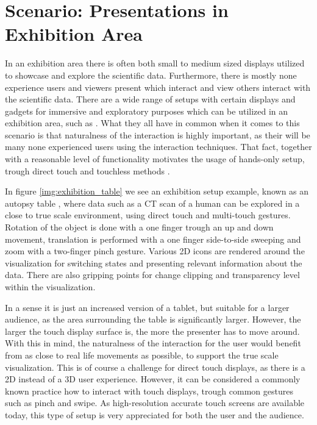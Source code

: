 \documentclass[review,journal]{vgtc}         %
\begin{document}
\section{Scenario: Presentations in Exhibition Area}

In an exhibition area there is often both small to medium sized displays utilized to showcase and explore the scientific data. Furthermore, there is mostly none experience users and viewers present which interact and view others interact with the scientific data. There are a wide range of setups with certain displays and gadgets for immersive and exploratory purposes which can be utilized in an exhibition area, such as \cite{Laha:2013:VCB:2491367.2491368, conf/egve/KruszynskiL08}. What they all have in common when it comes to this scenario is that naturalness of the interaction is highly important, as their will be many none experienced users using the interaction techniques. That fact, together with a reasonable level of functionality motivates the usage of hands-only setup, trough direct touch \cite{Klein:2012:DSD:2322389.2322403} and touchless methods \cite{O'hara:2013:NTP:2442106.2442111}.

In figure \ref{img:exhibition_table} we see an exhibition setup example, known as an autopsy table \cite{LRFPY11}, where data such as a CT scan of a human can be explored in a close to true scale environment, using direct touch and multi-touch gestures. Rotation of the object is done with a one finger trough an up and down movement, translation is performed with a one finger side-to-side sweeping and zoom with a two-finger pinch gesture. Various 2D icons are rendered around the visualization for switching states and presenting relevant information about the data. There are also gripping points for change clipping and transparency level within the visualization.

In a sense it is just an increased version of a tablet, but suitable for a larger audience, as the area surrounding the table is significantly larger. However, the larger the touch display surface is, the more the presenter has to move around. With this in mind, the naturalness of the interaction for the user would benefit from as close to real life movements as possible, to support the true scale visualization. This is of course a challenge for direct touch displays, as there is a 2D instead of a 3D user experience. However, it can be considered a commonly known practice how to interact with touch displays, trough common gestures such as pinch and swipe. As high-resolution accurate touch screens are available today, this type of setup is very appreciated for both the user and the audience.
\end{document}
